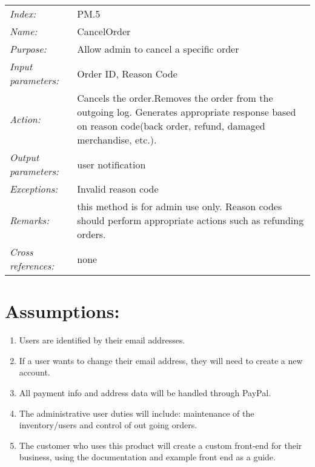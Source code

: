 \documentclass[10pt,letter]{article}
\begin{document}
\begin{tabularx}{\textwidth}{l X}

    \it{Index:} & PM.5 \\

    \it{Name:} & CancelOrder \\

    \it{Purpose:} &  Allow admin to cancel a specific order\\

    \it{Input parameters:} &  Order ID, Reason Code\\

    \it{Action:} & Cancels the order.Removes the order from the outgoing log. Generates appropriate response based on reason code(back order, refund, damaged merchandise, etc.).\\

    \it{Output parameters:} & user notification\\

    \it{Exceptions:} & Invalid reason code\\

    \it{Remarks:} & this method is for admin use only. Reason codes should perform appropriate actions such as refunding orders. \\

    \it{Cross references:} & none\\

    \hline

\end{tabularx}

\section{Assumptions:}
\begin{enumerate}
    \item Users are identified by their email addresses.
    \item If a user wants to change their email address, they will need to create a new account.
    \item All payment info and address data will be handled through PayPal.
    \item The administrative user duties will include: maintenance of the inventory/users and control of out going orders. 
    \item The customer who uses this product will create a custom front-end for their business, using the documentation and example front end as 
        a guide.
\end{enumerate}
\end{document}
